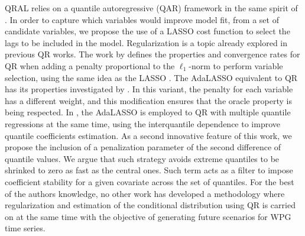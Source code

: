 QRAL relies on a quantile autoregressive (QAR) framework in the same spirit of \cite{koenker1978regression,koenker_quantile_2006,koenker2005quantile}. In order to capture which variables would improve model fit, from a set of candidate variables, we propose the use of a LASSO cost function to select the lags to be included in the model.
Regularization is a topic already explored in previous QR works.
The work by \cite{belloni_l1-penalized_2009} defines the properties and convergence rates for QR when adding a penalty proportional to the $\ell_1$-norm to perform variable selection, using the same idea as the LASSO \cite{tibshirani1996regression}. The AdaLASSO equivalent to QR has its properties investigated by \cite{ciuperca_adaptive_2016}. In this variant, the penalty for each variable has a different weight, and this modification ensures that the oracle property is being respected. %
In \cite{zou_regularized_2008,jiang_interquantile_2014}, the AdaLASSO is employed to QR with multiple quantile regressions at the same time, using the interquantile dependence to improve  quantile coefficients estimation.
As a second innovative feature of this work, we propose the inclusion of a penalization parameter of the second difference of quantile values. We argue that such strategy avoids extreme quantiles to be shrinked to zero as fast as the central ones. Such term acts as a filter to impose coefficient stability for a given covariate across the set of quantiles.
For the best of the authors knowledge, no other work has developed a methodology where regularization and estimation of the conditional distribution using QR is carried on at the same time with the objective of generating future scenarios for WPG time series.








